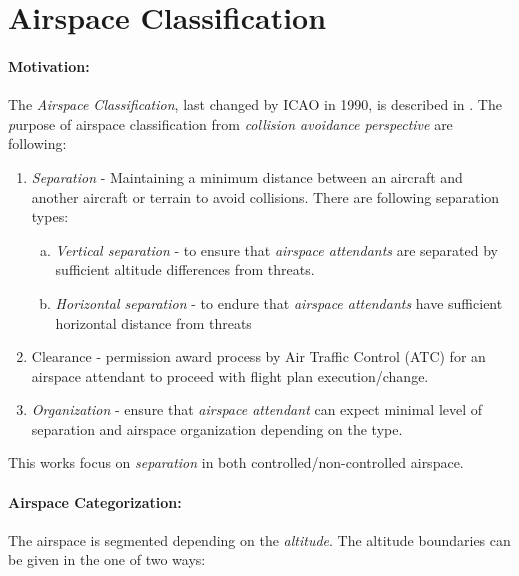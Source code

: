 
\section{Airspace Classification}\label{sec:AirspaceClassification}
\paragraph{Motivation:} The \emph{Airspace Classification}, last changed by ICAO in 1990, is described in \cite{icaoAnnex11}. The \emph purpose of airspace classification from \emph{collision avoidance perspective} are following:

\begin{enumerate}
    \item \emph{Separation} - Maintaining a minimum distance between an aircraft and another aircraft or terrain to avoid collisions. There are following separation types:
    \begin{enumerate}[a.]
        \item \emph{Vertical separation} - to ensure that \emph{airspace attendants} are separated by sufficient altitude differences from threats.
        
        \item \emph{Horizontal  separation} - to endure that \emph{airspace attendants} have sufficient horizontal distance from threats
    \end{enumerate}
    
    \item{Clearance} - permission award process by Air Traffic Control (ATC) for an airspace attendant to proceed with flight plan execution/change.
    
    \item \emph{Organization} - ensure that \emph{airspace attendant} can expect minimal level of separation and airspace organization depending on the type.
\end{enumerate}

\begin{note}
    This works focus on \emph{separation} in both controlled/non-controlled airspace.
\end{note}

\paragraph{Airspace Categorization:} The airspace is segmented depending on the \emph{altitude}. The altitude boundaries can be given in the one of two ways:


